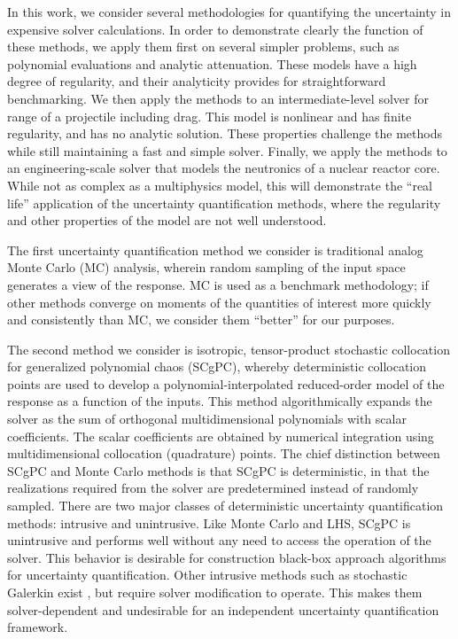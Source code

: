 In this work, we consider several methodologies for quantifying the uncertainty in expensive solver
calculations.  In order to demonstrate clearly the function of these methods, we apply them first on
several simpler problems, such as polynomial evaluations and analytic attenuation.  These models have a high
degree of regularity, and their analyticity provides for straightforward benchmarking.  We then apply the
methods to an intermediate-level solver for range of a projectile including drag.  This model is nonlinear and
has finite regularity, and has no analytic solution.  These properties challenge the methods while still
maintaining a fast and simple solver.  Finally, we apply the methods to an engineering-scale solver that
models the neutronics of a nuclear reactor core.  While not as complex as a multiphysics model, this will
demonstrate the ``real life'' application of the uncertainty quantification methods, where the regularity and
other properties of the model are not well understood.

The first uncertainty quantification method we consider
is traditional analog Monte Carlo (MC) analysis, wherein random sampling of the input space generates a view of
the response.  MC is used as a benchmark methodology; if other methods converge on moments of the quantities
of interest more quickly and consistently than MC, we consider them ``better'' for our purposes.

The second method we consider is isotropic, tensor-product stochastic collocation for generalized polynomial
chaos (SCgPC)\cite{sparseSC}\cite{sparse1}\cite{sparse2}\cite{xiu}, whereby deterministic collocation points 
are used to develop a polynomial-interpolated reduced-order model
of the response as a function of the inputs.  This method algorithmically expands the solver as the sum of
orthogonal multidimensional polynomials with scalar coefficients.  The scalar coefficients are obtained by
numerical integration using multidimensional collocation (quadrature) points.  The chief distinction between
SCgPC and Monte Carlo methods is that SCgPC is deterministic, in that the realizations required from the
solver are predetermined instead of randomly sampled.  There are two major classes of deterministic
uncertainty quantification methods: intrusive and unintrusive.  Like Monte Carlo and LHS, SCgPC is unintrusive
and performs well without any need to access the operation of the solver.  This behavior is desirable for
construction black-box approach algorithms for uncertainty quantification.  Other intrusive methods such as
stochastic Galerkin exist \cite{galerkin}, but require solver modification to operate.  This makes them
solver-dependent and undesirable for an independent uncertainty quantification framework.

